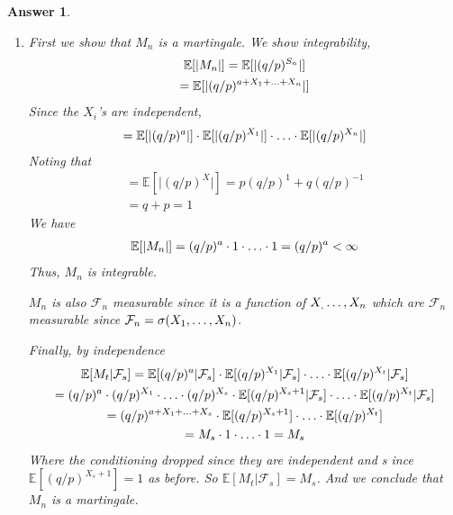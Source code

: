 \documentclass[12pt]{article}
\theoremstyle{colon}
\newtheorem*{answer}{Answer}
\begin{document}
\begin{answer}
  \leavevmode
  \begin{enumerate}[label=\alph*)]
    \item First we show that $M_n$ is a martingale. We show integrability,
      \begin{gather*}
        \mathbb{E}[ \lvert M_n \rvert ] = \mathbb{E}[ \lvert (q/p)^{S_n} \rvert ] \\
        = \mathbb{E}[ \lvert (q/p)^{a + X_1 + \mathellipsis + X_n} \rvert ]
      \end{gather*}
      Since the $X_i$'s are independent,
      \begin{gather*}
        = \mathbb{E}[ \lvert (q/p)^a \rvert ] \cdot \mathbb{E}[ \lvert (q/p)^{X_1} \rvert ] \cdot \mathellipsis \cdot \mathbb{E}[ \lvert (q/p)^{X_n} \rvert ]
      \end{gather*}
      Noting that
      \begin{gather*}
        = \mathbb{E}[ \lvert (q/p)^X \rvert ] = p (q/p)^1 + q (q/p)^{-1} \\
        = q + p = 1
      \end{gather*}
      We have
      \begin{gather*}
        \mathbb{E}[ \lvert M_n \rvert ] = (q/p)^a \cdot 1 \cdot \mathellipsis \cdot 1 = (q/p)^a < \infty
      \end{gather*}
      Thus, $M_n$ is integrable.

      $M_n$ is also $\mathcal{F}_n$ measurable since it is a function of $X_, \mathellipsis, X_n$ which are $\mathcal{F}_n$ measurable since $\mathcal{F}_n = \sigma(X_1, \mathellipsis, X_n)$.

      Finally, by independence
      \begin{gather*}
        \mathbb{E}[ M_t | \mathcal{F}_s ] = \mathbb{E}[(q/p)^a | \mathcal{F}_s] \cdot \mathbb{E}[(q/p)^{X_1} | \mathcal{F}_s] \cdot \mathellipsis \cdot \mathbb{E}[(q/p)^{X_t} | \mathcal{F}_s] \\
        = (q/p)^a \cdot (q/p)^{X_1} \cdot \mathellipsis \cdot (q/p)^{X_s} \cdot \mathbb{E}[(q/p)^{X_s+1} | \mathcal{F}_s] \cdot \mathellipsis \cdot \mathbb{E}[(q/p)^{X_t} | \mathcal{F}_s] \\
        = (q/p)^{a + X_1 + \mathellipsis + X_s} \cdot \mathbb{E}[(q/p)^{X_s+1}] \cdot \mathellipsis \cdot \mathbb{E}[(q/p)^{X_t}] \\
        = M_s \cdot 1 \cdot \mathellipsis \cdot 1 = M_s
      \end{gather*}
      Where the conditioning dropped since they are independent and s ince $\mathbb{E}[(q/p)^{X_s+1}] = 1$ as before. So $\mathbb{E}[ M_t | \mathcal{F}_s ] = M_s$. And we conclude that $M_n$ is a martingale.


\end{enumerate}
\end{answer}
\end{document}
